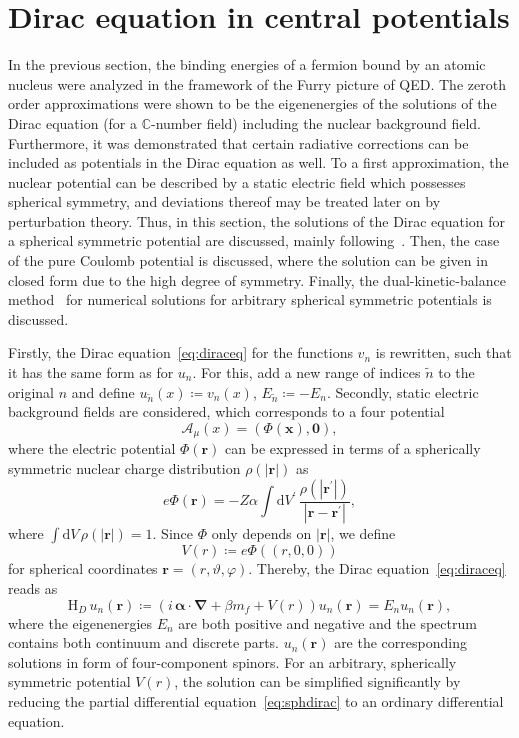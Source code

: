 \section{Dirac equation in central potentials}
\label{sec:sph_dirac}
In the previous section, the binding energies of a fermion bound by an atomic nucleus were analyzed in the framework of the Furry picture of QED. The zeroth order approximations were shown to be the eigenenergies of the solutions of the Dirac equation (for a \mbox{$\mathbb{C}$-number} field) including the nuclear background field. Furthermore, it was demonstrated that certain radiative corrections can be included as potentials in the Dirac equation as well. To a first approximation, the nuclear potential can be described by a static electric field which possesses spherical symmetry, and deviations thereof may be treated later on by perturbation theory. Thus, in this section, the solutions of the Dirac equation for a spherical symmetric potential are discussed, mainly following~\cite{greiner2000, weinberg2005}. Then, the case of the pure Coulomb potential is discussed, where the solution can be given in closed form due to the high degree of symmetry. Finally, the dual-kinetic-balance method~\cite{Shabaev2004} for numerical solutions for arbitrary spherical symmetric potentials is discussed.

Firstly, the Dirac equation~\eqref{eq:diraceq} for the functions $v_n$ is rewritten, such that it has the same form as for $u_n$. For this, add a new range of indices $\tilde{n}$ to the original $n$ and define $u_{\tilde{n}}(x)\coloneqq v_n(x)$, $E_{\tilde{n}}\coloneqq -E_n$. Secondly, static electric background fields are considered, which corresponds to a four potential
\begin{equation}
\mathcal{A}_\mu(x)=(\Phi(\mathbf{x}),\mathbf{0}),
\end{equation}
where the electric potential $\Phi(\mathbf{r})$ can be expressed in terms of a spherically symmetric nuclear charge distribution $\rho(\mathbf{|r|})$ as
\begin{equation}
\label{eq:furry_elPot}
e\Phi(\mathbf{r})=-Z\alpha\int\mathrm{d}V^{\prime}\,\frac{\rho(|\mathbf{r^{\prime}}|)}{|\mathbf{r}-\mathbf{r^{\prime}}|},
\end{equation}
where $\int \mathrm{d}V\,\rho(|\mathbf{r}|)=1$. Since $\Phi$ only depends on $|\mathbf{r}|$, we define $$V(r)\coloneqq e\Phi((r,0,0))\label{eq:FSpot}$$ for spherical coordinates $\mathbf{r}=(r,\vartheta,\varphi)$. Thereby, the Dirac equation~\eqref{eq:diraceq} reads as
\begin{equation}
\text{H}_D \, u_n(\mathbf{r})\coloneqq\left( i\,\pmb{\alpha} \cdot \mathbf{\nabla} + \beta m_f + V(r) \right) u_n(\mathbf{r}) =  E_n u_n(\mathbf{r}),
\label{eq:sphdirac}
\end{equation}
where the eigenenergies $E_n$ are both positive and negative and the spectrum contains both continuum and discrete parts. $u_n(\mathbf{r})$ are the corresponding solutions in form of four-component spinors. For an arbitrary, spherically symmetric potential $V(r)$, the solution can be simplified significantly by reducing the partial differential equation~\eqref{eq:sphdirac} to an ordinary differential equation.

